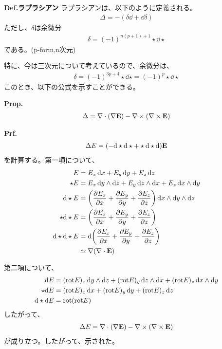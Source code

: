 \documentclass[a4paper,11pt]{jsarticle}
\numberwithin{equation}{section}
\begin{document}
\begin{itembox}[l]{\textbf{Def.ラプラシアン}}
  ラプラシアンは、以下のように定義される。
  \begin{align}
    \Delta = -(\delta \dd + \dd \delta)
  \end{align}
  ただし、$\delta$は余微分
  \begin{align}
    \delta = (-1)^{n(p+1)+1} \star \dd \star
  \end{align}
  である。(p-form,n次元)
\end{itembox}
特に、今は三次元について考えているので、余微分は、
\begin{align}
  \delta  = (-1)^{3p+4} \star \dd \star = (-1)^{p} \star \dd \star
\end{align}
このとき、以下の公式を示すことができる。

\begin{itembox}[l]{\textbf{Prop.}}
  \begin{align}
    \Delta = \nabla \cdot \qty(\nabla \vb{E}) - \nabla \times \qty(\nabla \times \vb{E})
  \end{align}
\end{itembox}
\textbf{Prf.}\\
\begin{align}
  \Delta E = (-\dd \star \dd \star + \star \dd \star \dd)\vb{E}
\end{align}
を計算する。第一項について、
\begin{align}
  E &= E_{x}\dd{x} + E_{y}\dd{y} + E_{z}\dd{z}\\
  \star E &= E_{x}\dd{y}\wedge \dd{z} + E_{y}\dd{z}\wedge \dd{x} + E_{z}\dd{x}\wedge \dd{y}\\
  \dd \star E &= \qty(\pdv{E_{x}}{x}+\pdv{E_{y}}{y}+\pdv{E_{z}}{z})\dd{x}\wedge \dd{y}\wedge \dd{z}\\
  \star \dd \star E &= \qty(\pdv{E_{x}}{x} + \pdv{E_{y}}{y} + \pdv{E_{z}}{z})\\
  \dd \star \dd \star E &= \dd \qty(\pdv{E_{x}}{x} + \pdv{E_{y}}{y} + \pdv{E_{z}}{z})\\
  &\simeq \nabla \qty(\nabla \cdot \vb{E})
\end{align}

第二項について、
\begin{align}
  \dd E &= (\text{rot} E)_x \dd{y}\wedge \dd{z} + (\text{rot} E)_y \dd{z}\wedge \dd{x} + (\text{rot} E)_z \dd{x}\wedge \dd{y}\\
  \star \dd E &= (\text{rot} E)_x \dd{x} + (\text{rot} E)_y \dd{y} + (\text{rot} E)_z \dd{z}\\
  \dd \star \dd E &= \text{rot} \qty(\text{rot} E)
\end{align}
したがって、
\begin{align}
  \Delta E = \nabla \cdot \qty(\nabla \vb{E}) - \nabla \times \qty(\nabla \times \vb{E})
\end{align}
が成り立つ。したがって、示された。\hfill\qedsymbol\\
\end{document}
